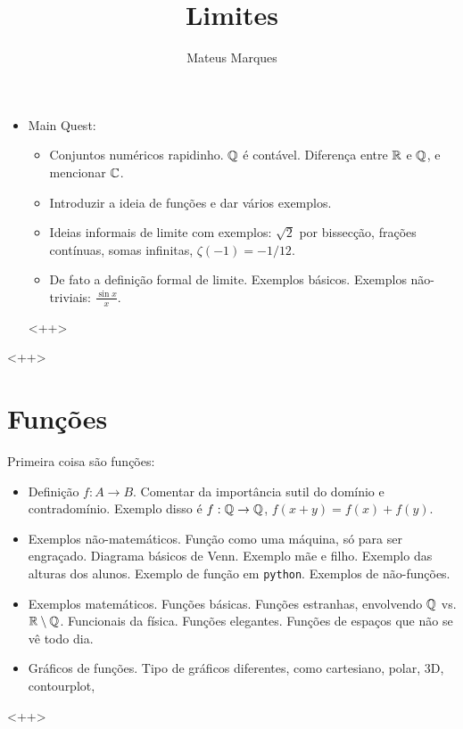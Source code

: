 \documentclass[a4paper,fleqn,12pt]{article}
\title{\Huge{\textbf{Limites}}}
\author{Mateus Marques}
\begin{document}
\maketitle

\begin{itemize}
\item Main Quest:
\begin{itemize}
\item Conjuntos numéricos rapidinho. $\mathbb{Q}$ é contável. Diferença entre $\mathbb{R}$ e $\mathbb{Q}$, e mencionar $\mathbb{C}$.
\item Introduzir a ideia de funções e dar vários exemplos.
\item Ideias informais de limite com exemplos: $\sqrt{2}$ por bissecção, frações contínuas, somas infinitas, $\zeta(-1) = -1/12$.
\item De fato a definição formal de limite. Exemplos básicos. Exemplos não-triviais: $\frac{\sin x}{x}$.
\end{itemize}
<++>
\end{itemize}
<++>

\section{Funções}

Primeira coisa são funções:
\begin{itemize}
\item Definição $f: A \to B$. Comentar da importância sutil do domínio e contradomínio. Exemplo disso é $f:\mathbb{Q} \to \mathbb{Q}$, $f(x+y) = f(x) + f(y)$.
\item Exemplos não-matemáticos. Função como uma máquina, só para ser engraçado. Diagrama básicos de Venn. Exemplo mãe e filho. Exemplo das alturas dos alunos. Exemplo de função em \texttt{python}. Exemplos de não-funções.
\item Exemplos matemáticos. Funções básicas. Funções estranhas, envolvendo $\mathbb{Q}$ vs. $\mathbb{R}\setminus\mathbb{Q}$. Funcionais da física. Funções elegantes. Funções de espaços que não se vê todo dia.
\item Gráficos de funções. Tipo de gráficos diferentes, como cartesiano, polar, 3D, contourplot,
\end{itemize}
<++>
\end{document}

